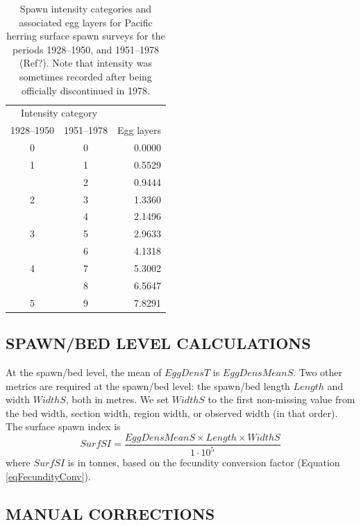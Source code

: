 \documentclass[12pt]{article}
\begin{document}
\begin{table}
\centering
\caption[Spawn intensity categories and associated egg layers for Pacific herring surface spawn surveys]
{Spawn intensity categories and associated egg layers for Pacific herring surface spawn surveys for the periods 1928--1950, and 1951--1978 (Ref?).
Note that intensity was sometimes recorded after being officially discontinued in 1978.}
\begin{tabular}{ccr}
\toprule
\multicolumn{2}{c}{Intensity category} & \\
1928--1950 & 1951--1978 & Egg layers\\
\midrule
0 & 0 & 0.0000 \\
1 & 1 & 0.5529 \\
 & 2 & 0.9444 \\
2 & 3 & 1.3360 \\
 & 4 & 2.1496 \\
3 & 5 & 2.9633 \\
 & 6 & 4.1318 \\
4 & 7 & 5.3002 \\
 & 8 & 6.5647 \\
5 & 9 & 7.8291 \\
\bottomrule
\end{tabular}
\label{tabIntensity}
\end{table}

\subsection{SPAWN/BED LEVEL CALCULATIONS}

At the spawn/bed level, the mean of $EggDensT$ is $EggDensMeanS$.
Two other metrics are required at the spawn/bed level: the spawn/bed length $Length$ and width $WidthS$, both in metres.
We set $WidthS$ to the first non-missing value from the bed width, section width, region width, or observed width (in that order).
The surface spawn index is
\begin{equation}
SurfSI = \frac{EggDensMeanS \times Length \times WidthS} {1 \cdot 10^{5}}
\label{eqBiomassSurf}
\end{equation}
where $SurfSI$ is in tonnes, based on the fecundity conversion factor (Equation \ref{eqFecundityConv}).

\subsection{MANUAL CORRECTIONS}
\end{document}
